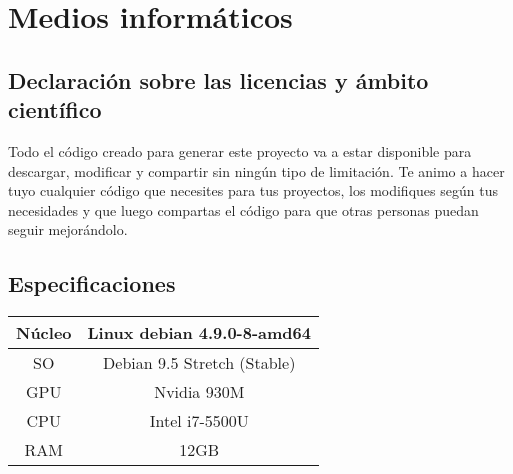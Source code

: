 \chapter*{Medios informáticos}
\section*{Declaración sobre las licencias y ámbito científico}

Todo el código creado para generar este proyecto va a estar disponible para descargar, modificar y compartir sin ningún tipo de limitación. Te animo a hacer tuyo cualquier código que necesites para tus proyectos, los modifiques según tus necesidades y que luego compartas el código para que otras personas puedan seguir mejorándolo.

\section*{Especificaciones}
\begin{table}[htbp]
	\centering %
	\begin{tabular}{|c|c|}
		
		\hline
		Núcleo & Linux debian 4.9.0-8-amd64  \\ \hline
		SO & Debian 9.5 Stretch (Stable) \\ \hline
		GPU & Nvidia 930M \\ \hline
		CPU & Intel i7-5500U \\ \hline
		RAM & 12GB \\
		\hline
	\end{tabular}
	\label{tab:specs}
\end{table}